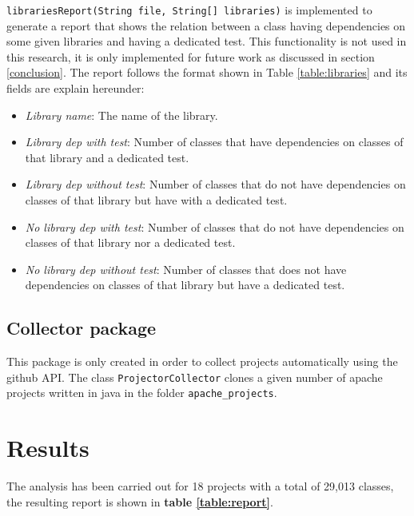 \documentclass[11pt, a4paper, twocolumn]{article}
\begin{document}
\begin{description}
\item{\texttt{librariesReport(String file, String[] libraries)}} is implemented to generate a report that shows the relation between a class having dependencies on some given libraries and having a dedicated test. This functionality is not used in this research, it is only implemented for future work as discussed in section \ref {conclusion}. The report follows the format shown in Table \ref{table:libraries} and its fields are explain hereunder:
\begin{itemize}
\item \textit{Library name}: The name of the library.
\item \textit{Library dep with test}: Number of classes that have dependencies on classes of that library and a dedicated test.
\item \textit{Library dep without test}: Number of classes that do not have dependencies on classes of that library but have with a dedicated test.
\item \textit{No library dep with test}: Number of classes that do not have dependencies on classes of that library nor a dedicated test.
\item \textit{No library dep without test}: Number of classes that does not have dependencies on classes of that library but have a dedicated test.
\end{itemize}


\end{description}

\subsection{Collector package}
This package is only created in order to collect projects automatically using the github API. The class \texttt{ProjectorCollector} clones a given number of apache projects written in java in the folder \verb+apache_projects+.


\section{Results}
The analysis has been carried out for 18 projects with a total of 29,013 classes, the resulting report is shown in \textbf{table \ref{table:report}}.\\
\end{document}
